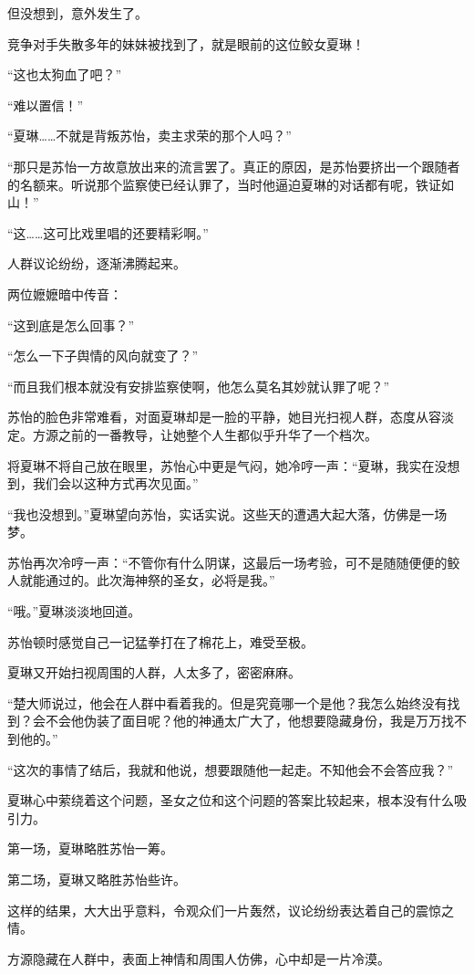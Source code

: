 \begin{this_body}
但没想到，意外发生了。

竞争对手失散多年的妹妹被找到了，就是眼前的这位鲛女夏琳！

“这也太狗血了吧？”

“难以置信！”

“夏琳……不就是背叛苏怡，卖主求荣的那个人吗？”

“那只是苏怡一方故意放出来的流言罢了。真正的原因，是苏怡要挤出一个跟随者的名额来。听说那个监察使已经认罪了，当时他逼迫夏琳的对话都有呢，铁证如山！”

“这……这可比戏里唱的还要精彩啊。”

人群议论纷纷，逐渐沸腾起来。

两位嬷嬷暗中传音：

“这到底是怎么回事？”

“怎么一下子舆情的风向就变了？”

“而且我们根本就没有安排监察使啊，他怎么莫名其妙就认罪了呢？”

苏怡的脸色非常难看，对面夏琳却是一脸的平静，她目光扫视人群，态度从容淡定。方源之前的一番教导，让她整个人生都似乎升华了一个档次。

将夏琳不将自己放在眼里，苏怡心中更是气闷，她冷哼一声：“夏琳，我实在没想到，我们会以这种方式再次见面。”

“我也没想到。”夏琳望向苏怡，实话实说。这些天的遭遇大起大落，仿佛是一场梦。

苏怡再次冷哼一声：“不管你有什么阴谋，这最后一场考验，可不是随随便便的鲛人就能通过的。此次海神祭的圣女，必将是我。”

“哦。”夏琳淡淡地回道。

苏怡顿时感觉自己一记猛拳打在了棉花上，难受至极。

夏琳又开始扫视周围的人群，人太多了，密密麻麻。

“楚大师说过，他会在人群中看着我的。但是究竟哪一个是他？我怎么始终没有找到？会不会他伪装了面目呢？他的神通太广大了，他想要隐藏身份，我是万万找不到他的。”

“这次的事情了结后，我就和他说，想要跟随他一起走。不知他会不会答应我？”

夏琳心中萦绕着这个问题，圣女之位和这个问题的答案比较起来，根本没有什么吸引力。

第一场，夏琳略胜苏怡一筹。

第二场，夏琳又略胜苏怡些许。

这样的结果，大大出乎意料，令观众们一片轰然，议论纷纷表达着自己的震惊之情。

方源隐藏在人群中，表面上神情和周围人仿佛，心中却是一片冷漠。


\end{this_body}
